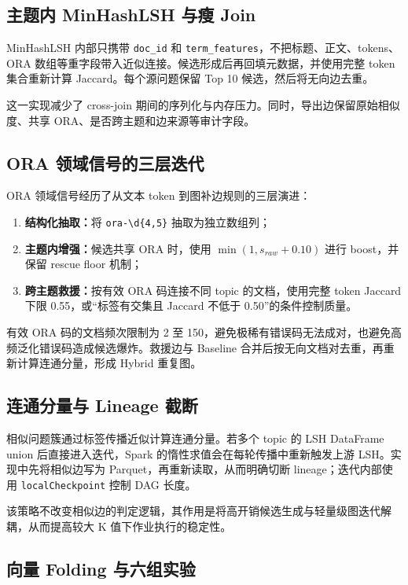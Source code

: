 \documentclass[a4paper,UTF8,zihao=5,fontset=windows]{ctexart}
\newcommand{\code}[1]{\texttt{#1}}
\begin{document}
\subsection{主题内 MinHashLSH 与瘦 Join}

MinHashLSH 内部只携带 \code{doc\_id} 和 \code{term\_features}，不把标题、正文、tokens、ORA 数组等重字段带入近似连接。候选形成后再回填元数据，并使用完整 token 集合重新计算 Jaccard。每个源问题保留 Top 10 候选，然后将无向边去重。

这一实现减少了 cross-join 期间的序列化与内存压力。同时，导出边保留原始相似度、共享 ORA、是否跨主题和边来源等审计字段。

\subsection{ORA 领域信号的三层迭代}

ORA 领域信号经历了从文本 token 到图补边规则的三层演进：

\begin{enumerate}
  \item \textbf{结构化抽取：}将 \code{ora-\textbackslash d\{4,5\}} 抽取为独立数组列；
  \item \textbf{主题内增强：}候选共享 ORA 时，使用 \(\min(1, s_{raw}+0.10)\) 进行 boost，并保留 rescue floor 机制；
  \item \textbf{跨主题救援：}按有效 ORA 码连接不同 topic 的文档，使用完整 token Jaccard 下限 0.55，或“标签有交集且 Jaccard 不低于 0.50”的条件控制质量。
\end{enumerate}

有效 ORA 码的文档频次限制为 2 至 150，避免极稀有错误码无法成对，也避免高频泛化错误码造成候选爆炸。救援边与 Baseline 合并后按无向文档对去重，再重新计算连通分量，形成 Hybrid 重复图。

\subsection{连通分量与 Lineage 截断}

相似问题簇通过标签传播近似计算连通分量。若多个 topic 的 LSH DataFrame union 后直接进入迭代，Spark 的惰性求值会在每轮传播中重新触发上游 LSH。实现中先将相似边写为 Parquet，再重新读取，从而明确切断 lineage；迭代内部使用 \code{localCheckpoint} 控制 DAG 长度。

该策略不改变相似边的判定逻辑，其作用是将高开销候选生成与轻量级图迭代解耦，从而提高较大 K 值下作业执行的稳定性。

\subsection{向量 Folding 与六组实验}
\end{document}
